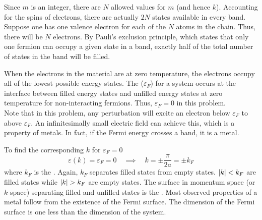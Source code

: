 \documentclass[12pt,a4paper,titlepage]{article}
\newcommand{\ul}[1]{\underline{\smash{#1}}} %
\begin{document}
Since $m$ is an integer, there are $N$ allowed values for $m$ (and hence $k$). Accounting for the spins of electrons, there are actually $2N$ states available in every band. Suppose one has one valence electron for each of the $N$ atoms in the chain. Thus, there will be $N$ electrons. By Pauli's exclusion principle, which states that only one fermion can occupy a given state in a band, exactly half of the total number of states in the band will be filled.
\begin{center}
\end{center}
When the electrons in the material are at zero temperature, the electrons occupy all of the lowest possible energy states. The \ul{Fermi energy} ($\varepsilon_{F}$) for a system occurs at the interface between filled energy states and unfilled energy states at zero temperature for non-interacting fermions. Thus, $\varepsilon_{F}=0$ in this problem.\\

Note that in this problem, any perturbation will excite an electron below $\varepsilon_{F}$ to above $\varepsilon_{F}$. An infinitesimally small electric field can achieve this, which is a property of metals. In fact, if the Fermi energy crosses a band, it is a metal.\bigskip

To find the corresponding $k$ for $\varepsilon_{F}=0$
\begin{equation}
\varepsilon(k)=\varepsilon_{F}=0\quad\implies\quad k=\pm\frac{\pi}{2a}=\pm k_{F}
\end{equation}
where $k_{F}$ is the \ul{Fermi wave vector}. Again, $k_{F}$ separates filled states from empty states. $\abs{k}<k_{F}$ are filled states while $\abs{k}>k_{F}$ are empty states. The surface in momentum space (or $k$-space) separating filled and unfilled states is the \ul{Fermi surface}. Most observed properties of a metal follow from the existence of the Fermi surface. The dimension of the Fermi surface is one less than the dimension of the system.\\
\end{document}
